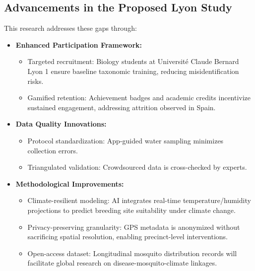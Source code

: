 \documentclass[acmlarge]{acmart}
\begin{document}
\subsection{Advancements in the Proposed Lyon Study}
This research addresses these gaps through:
\begin{itemize}
\item \textbf{Enhanced Participation Framework:}
\begin{itemize}
\item Targeted recruitment: Biology students at Université Claude Bernard Lyon 1 ensure baseline taxonomic training, reducing misidentification risks.
\item Gamified retention: Achievement badges and academic credits incentivize sustained engagement, addressing attrition observed in Spain.
\end{itemize}
\item \textbf{Data Quality Innovations:}
\begin{itemize}
\item Protocol standardization: App-guided water sampling minimizes collection errors.
\item Triangulated validation: Crowdsourced data is cross-checked by experts.
\end{itemize}
\item \textbf{Methodological Improvements:}
\begin{itemize}
\item Climate-resilient modeling: AI integrates real-time temperature/humidity projections to predict breeding site suitability under climate change.
\item Privacy-preserving granularity: GPS metadata is anonymized without sacrificing spatial resolution, enabling precinct-level interventions.
\item Open-access dataset: Longitudinal mosquito distribution records will facilitate global research on disease-mosquito-climate linkages.
\end{itemize}
\end{itemize}














\end{document}
